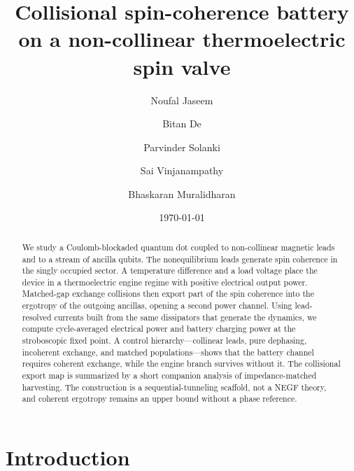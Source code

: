 \documentclass[aps,pre,twocolumn,floatfix,groupedaddress,amsmath,amssymb,nofootinbib]{revtex4-2}
\begin{document}
\title{Collisional spin-coherence battery on a non-collinear
thermoelectric spin valve}

\author{Noufal Jaseem}
\author{Bitan De}
\author{Parvinder Solanki}
\author{Sai Vinjanampathy}
\author{Bhaskaran Muralidharan}
\date{\today}

\begin{abstract}
We study a Coulomb-blockaded quantum dot coupled to non-collinear magnetic
leads and to a stream of ancilla qubits. The nonequilibrium leads generate
spin coherence in the singly occupied sector. A temperature difference and a
load voltage place the device in a thermoelectric engine regime with positive
electrical output power. Matched-gap exchange collisions then export part of
the spin coherence into the ergotropy of the outgoing ancillas, opening a
second power channel. Using lead-resolved currents built from the same
dissipators that generate the dynamics, we compute cycle-averaged electrical
power and battery charging power at the stroboscopic fixed point. A control
hierarchy---collinear leads, pure dephasing, incoherent exchange, and matched
populations---shows that the battery channel requires coherent exchange, while
the engine branch survives without it. The collisional export map is
summarized by a short companion analysis of impedance-matched harvesting.
The construction is a sequential-tunneling scaffold, not a NEGF theory, and
coherent ergotropy remains an upper bound without a phase reference.
\end{abstract}

\maketitle

\section{Introduction}
\end{document}
